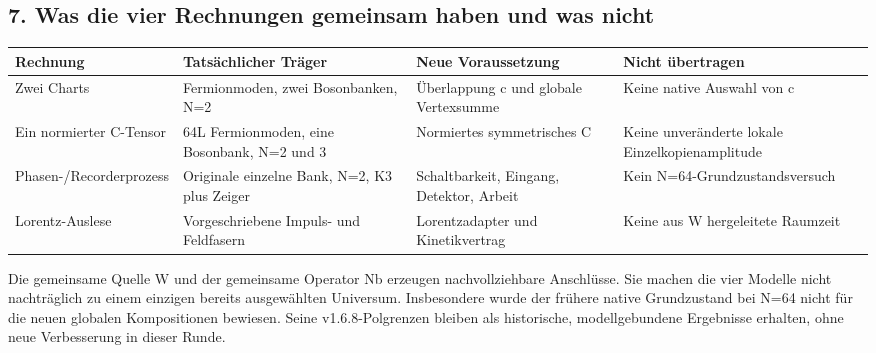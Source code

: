 \subsection{7. Was die vier Rechnungen gemeinsam haben und was
nicht}\label{was-die-vier-rechnungen-gemeinsam-haben-und-was-nicht}

{\def\LTcaptype{none} %
\begin{longtable}[]{@{}
  >{\raggedright\arraybackslash}p{}
  >{\raggedright\arraybackslash}p{}
  >{\raggedright\arraybackslash}p{}
  >{\raggedright\arraybackslash}p{}@{}}
\toprule\noalign{}
\begin{minipage}[b]{\linewidth}\raggedright
Rechnung
\end{minipage} & \begin{minipage}[b]{\linewidth}\raggedright
Tatsächlicher Träger
\end{minipage} & \begin{minipage}[b]{\linewidth}\raggedright
Neue Voraussetzung
\end{minipage} & \begin{minipage}[b]{\linewidth}\raggedright
Nicht übertragen
\end{minipage} \\
\midrule\noalign{}
\endhead
\bottomrule\noalign{}
\endlastfoot
Zwei Charts & 128 Fermionmoden, zwei Bosonbanken, N=2 & Überlappung c
und globale Vertexsumme & Keine native Auswahl von c \\
Ein normierter C-Tensor & 64L Fermionmoden, eine Bosonbank, N=2 und 3 &
Normiertes symmetrisches C & Keine unveränderte lokale
Einzelkopienamplitude \\
Phasen-/Recorderprozess & Originale einzelne Bank, N=2, K3 plus Zeiger &
Schaltbarkeit, Eingang, Detektor, Arbeit & Kein
N=64-Grundzustandsversuch \\
Lorentz-Auslese & Vorgeschriebene Impuls- und Feldfasern &
Lorentzadapter und Kinetikvertrag & Keine aus W hergeleitete Raumzeit \\
\end{longtable}
}

Die gemeinsame Quelle W und der gemeinsame Operator Nb erzeugen
nachvollziehbare Anschlüsse. Sie machen die vier Modelle nicht
nachträglich zu einem einzigen bereits ausgewählten Universum.
Insbesondere wurde der frühere native Grundzustand bei N=64 nicht für
die neuen globalen Kompositionen bewiesen. Seine v1.6.8-Polgrenzen
bleiben als historische, modellgebundene Ergebnisse erhalten, ohne neue
Verbesserung in dieser Runde.

